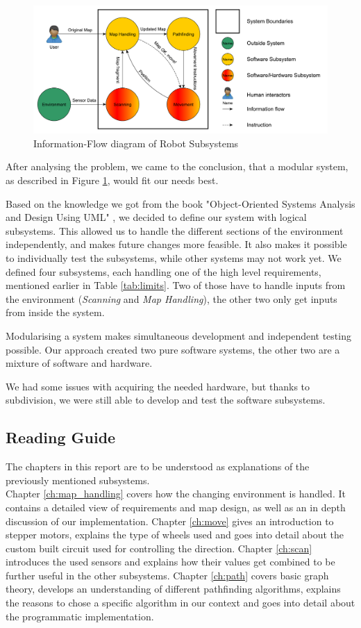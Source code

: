 \begin{figure}[!ht]
	\centering
	\includegraphics[width=\textwidth]{figures/intro/systemview}
	\caption{Information-Flow diagram of Robot Subsystems}
	\label{fig:system} 
\end{figure}
After analysing the problem,
we came to the conclusion,
that a modular system,
as described in Figure \ref{fig:system},
would fit our needs best.

Based on the knowledge we got from the book
"Object-Oriented Systems Analysis and Design  Using UML" \cite{Benett2010},
we decided to define our system with logical subsystems.
This allowed us to handle the different sections of the environment independently,
and makes future changes more feasible.
It also makes it possible to individually test the subsystems,
while other systems may not work yet.
We defined four subsystems, each handling one of the high level requirements,
mentioned earlier in Table \ref{tab:limits}.
Two of those have to handle inputs from the environment (\emph{Scanning} and \emph{Map Handling}),
the other two only get inputs from inside the system.

Modularising a system makes simultaneous development
and independent testing possible.
Our approach created two pure software systems,
the other two are a mixture of software and hardware.

We had some issues with acquiring the needed hardware,
but thanks to subdivision,
we were still able to develop and test the software subsystems.

\subsection*{Reading Guide}
The chapters in this report are to be understood as explanations of the previously mentioned subsystems.\\
Chapter \ref{ch:map_handling} covers how the changing environment is handled.
It contains a detailed view of requirements and map design,
as well as an in depth discussion of our implementation.
Chapter \ref{ch:move} gives an introduction to stepper motors, explains the type of wheels used and goes into detail about the custom built circuit used for controlling the direction.
Chapter \ref{ch:scan} introduces the used sensors and 
explains how their values get combined to be further useful in the other subsystems.
Chapter \ref{ch:path} covers basic graph theory,
develops an understanding of different pathfinding algorithms,
explains the reasons to chose a specific algorithm in our context and
goes into detail about the programmatic implementation.

